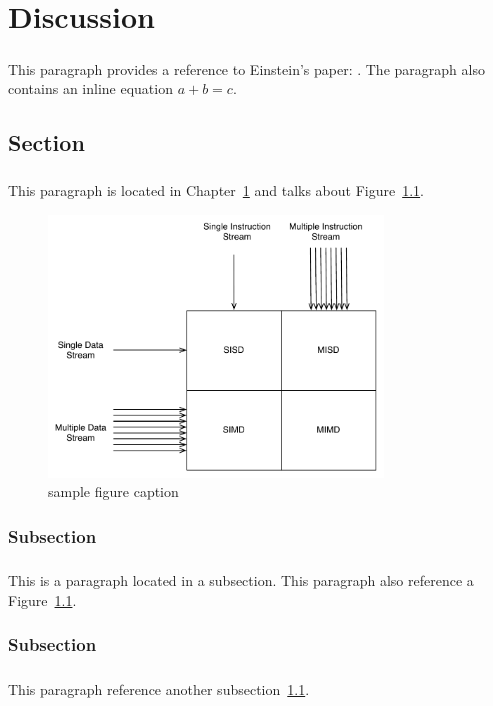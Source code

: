 \chapter{Discussion}
\label{chap:chapter1}

\paragraph{}This paragraph provides a reference to Einstein's paper: \cite{Einstein}. The paragraph also contains an inline equation $a+b=c$.

\section{Section}
\label{sec:section1}

\paragraph{}This paragraph is located in Chapter~\ref{chap:chapter1} and talks about Figure~\ref{fig:sampleFigureLabel}.

\begin{figure}[h]
\centering
\includegraphics[width=3.5in]{./Figures/sampleFigureFlynn.pdf}
\caption{sample figure caption}
\label{fig:sampleFigureLabel}
\end{figure}

\subsection{Subsection} 
\label{ssec:subsection1}


\paragraph{}This is a paragraph located in a subsection.  This paragraph also reference a  Figure~\ref{fig:sampleFigureLabel}.


\subsection{Subsection}
\label{ssec:subsection2}

\paragraph{}This paragraph reference another subsection~\ref{sec:section1}.